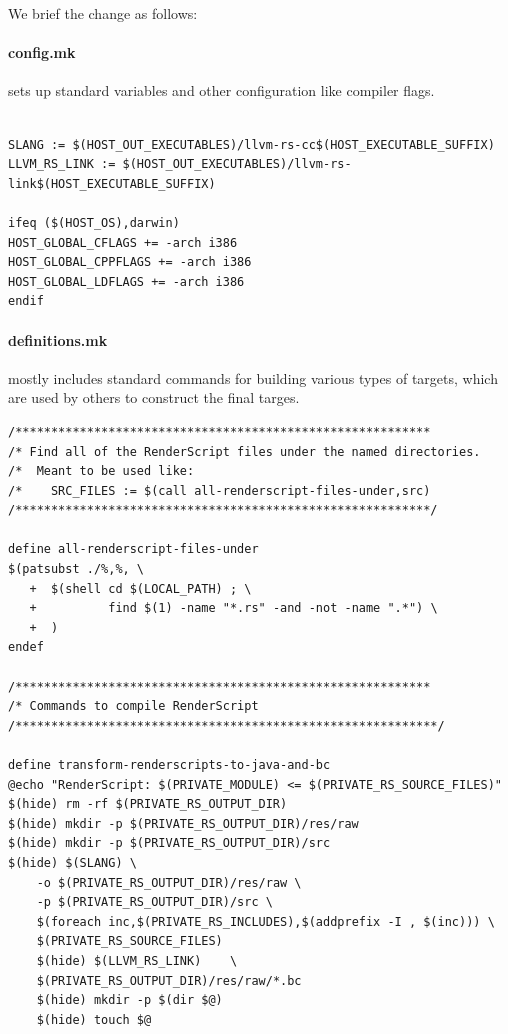 We brief the change as follows:
\paragraph{config.mk} sets up standard variables and other configuration like compiler flags.

\begin{lstlisting}[style=nonumbers]

SLANG := $(HOST_OUT_EXECUTABLES)/llvm-rs-cc$(HOST_EXECUTABLE_SUFFIX)
LLVM_RS_LINK := $(HOST_OUT_EXECUTABLES)/llvm-rs-link$(HOST_EXECUTABLE_SUFFIX)

ifeq ($(HOST_OS),darwin)
HOST_GLOBAL_CFLAGS += -arch i386
HOST_GLOBAL_CPPFLAGS += -arch i386
HOST_GLOBAL_LDFLAGS += -arch i386
endif

\end{lstlisting}

\paragraph{definitions.mk} mostly includes standard commands for building various types of targets, which are used by others to construct the final targes.
\begin{lstlisting}[style=nonumbers]
/**********************************************************
/* Find all of the RenderScript files under the named directories.
/*  Meant to be used like:
/*    SRC_FILES := $(call all-renderscript-files-under,src)
/**********************************************************/

define all-renderscript-files-under
$(patsubst ./%,%, \
   +  $(shell cd $(LOCAL_PATH) ; \
   +          find $(1) -name "*.rs" -and -not -name ".*") \
   +  )
endef

/**********************************************************
/* Commands to compile RenderScript
/***********************************************************/

define transform-renderscripts-to-java-and-bc
@echo "RenderScript: $(PRIVATE_MODULE) <= $(PRIVATE_RS_SOURCE_FILES)"
$(hide) rm -rf $(PRIVATE_RS_OUTPUT_DIR)
$(hide) mkdir -p $(PRIVATE_RS_OUTPUT_DIR)/res/raw
$(hide) mkdir -p $(PRIVATE_RS_OUTPUT_DIR)/src
$(hide) $(SLANG) \
    -o $(PRIVATE_RS_OUTPUT_DIR)/res/raw \
    -p $(PRIVATE_RS_OUTPUT_DIR)/src \
    $(foreach inc,$(PRIVATE_RS_INCLUDES),$(addprefix -I , $(inc))) \
    $(PRIVATE_RS_SOURCE_FILES)
    $(hide) $(LLVM_RS_LINK)    \
    $(PRIVATE_RS_OUTPUT_DIR)/res/raw/*.bc
    $(hide) mkdir -p $(dir $@)
    $(hide) touch $@
\end{lstlisting}

